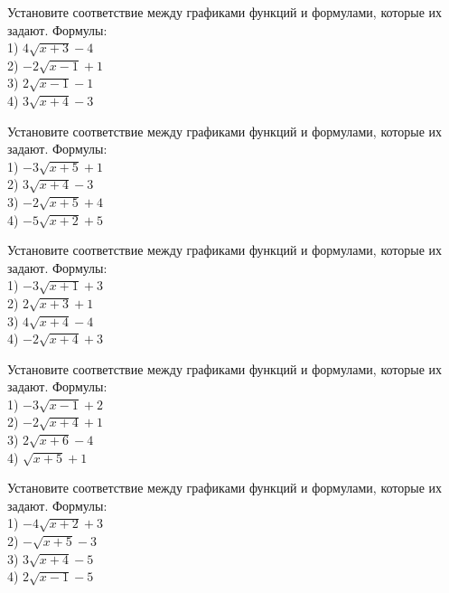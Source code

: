 \documentclass[4apaper]{article}
\begin{document}
\begin{taskBN}{61}
Установите соответствие между графиками функций и формулами, которые их задают. Формулы: \\1) $4\sqrt{x+3}-4$\\2) $-2\sqrt{x-1}+1$\\3) $2\sqrt{x-1}-1$\\4) $3\sqrt{x+4}-3$
\end{taskBN}

\begin{taskBN}{62}
Установите соответствие между графиками функций и формулами, которые их задают. Формулы: \\1) $-3\sqrt{x+5}+1$\\2) $3\sqrt{x+4}-3$\\3) $-2\sqrt{x+5}+4$\\4) $-5\sqrt{x+2}+5$
\end{taskBN}

\begin{taskBN}{63}
Установите соответствие между графиками функций и формулами, которые их задают. Формулы: \\1) $-3\sqrt{x+1}+3$\\2) $2\sqrt{x+3}+1$\\3) $4\sqrt{x+4}-4$\\4) $-2\sqrt{x+4}+3$
\end{taskBN}

\begin{taskBN}{64}
Установите соответствие между графиками функций и формулами, которые их задают. Формулы: \\1) $-3\sqrt{x-1}+2$\\2) $-2\sqrt{x+4}+1$\\3) $2\sqrt{x+6}-4$\\4) $\sqrt{x+5}+1$
\end{taskBN}

\begin{taskBN}{65}
Установите соответствие между графиками функций и формулами, которые их задают. Формулы: \\1) $-4\sqrt{x+2}+3$\\2) $-\sqrt{x+5}-3$\\3) $3\sqrt{x+4}-5$\\4) $2\sqrt{x-1}-5$
\end{taskBN}
\end{document}
